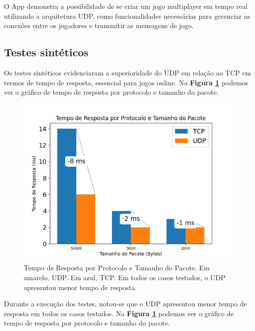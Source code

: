 \documentclass[12pt]{article}
\begin{document}
\begin{figure}[h]
  \hfill
\end{figure}

O App demonstra a possibilidade de se criar um jogo multiplayer em tempo real utilizando a arquitetura UDP, como funcionalidades necessárias para gerenciar as conexões entre os jogadores e transmitir as mensagens de jogo.

\FloatBarrier
\subsection{Testes sintéticos}
Os testes sintéticos evidenciaram a superioridade do UDP em relação ao TCP em termos de tempo de resposta, essencial para jogos online. Na {\bf Figura \ref{fig:graficofig}} podemos ver o gráfico de tempo de resposta por protocolo e tamanho do pacote.
\begin{figure}[ht]
  \centering
  \includegraphics[width=1\textwidth]{grafico_2.png}
  \caption{Tempo de Resposta por Protocolo e Tamanho do Pacote. Em amarelo, UDP. Em azul, TCP. Em todos os casos testados, o UDP apresentou menor tempo de resposta.}
  \label{fig:graficofig}
\end{figure}
\FloatBarrier
Durante a execução dos testes, notou-se que o UDP apresentou menor tempo de resposta em todos os casos testados. Na {\bf Figura \ref{fig:graficofig}} podemos ver o gráfico de tempo de resposta por protocolo e tamanho do pacote.
\end{document}
